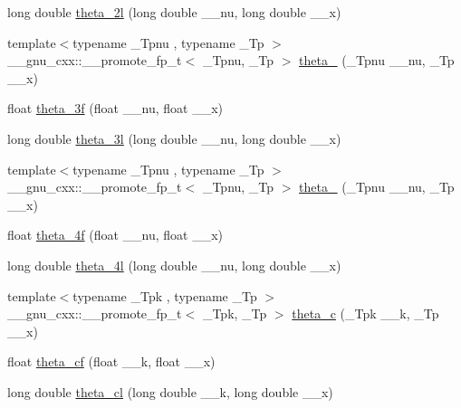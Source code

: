 \begin{DoxyCompactItemize}
\item 
long double \hyperlink{group__gnu__math__spec__func_gac5a30c772d4888442665945e7f3fa017}{theta\+\_\+2l} (long double \+\_\+\+\_\+nu, long double \+\_\+\+\_\+x)
\item 
{\footnotesize template$<$typename \+\_\+\+Tpnu , typename \+\_\+\+Tp $>$ }\\\+\_\+\+\_\+gnu\+\_\+cxx\+::\+\_\+\+\_\+promote\+\_\+fp\+\_\+t$<$ \+\_\+\+Tpnu, \+\_\+\+Tp $>$ \hyperlink{group__gnu__math__spec__func_ga34e5d79e6ba8b8b104e690fc1ebc7fd6}{theta\+\_} (\+\_\+\+Tpnu \+\_\+\+\_\+nu, \+\_\+\+Tp \+\_\+\+\_\+x)
\item 
float \hyperlink{group__gnu__math__spec__func_ga9a7c967d2a456f1a6aceee9a53f024b1}{theta\+\_\+3f} (float \+\_\+\+\_\+nu, float \+\_\+\+\_\+x)
\item 
long double \hyperlink{group__gnu__math__spec__func_gaf88874ff6c69940d2191f7947d2ea119}{theta\+\_\+3l} (long double \+\_\+\+\_\+nu, long double \+\_\+\+\_\+x)
\item 
{\footnotesize template$<$typename \+\_\+\+Tpnu , typename \+\_\+\+Tp $>$ }\\\+\_\+\+\_\+gnu\+\_\+cxx\+::\+\_\+\+\_\+promote\+\_\+fp\+\_\+t$<$ \+\_\+\+Tpnu, \+\_\+\+Tp $>$ \hyperlink{group__gnu__math__spec__func_ga25e72f2b50b53d168f8fa653b1a0d012}{theta\+\_} (\+\_\+\+Tpnu \+\_\+\+\_\+nu, \+\_\+\+Tp \+\_\+\+\_\+x)
\item 
float \hyperlink{group__gnu__math__spec__func_ga0c5cbf87e304844ed4c3423be5ca09a5}{theta\+\_\+4f} (float \+\_\+\+\_\+nu, float \+\_\+\+\_\+x)
\item 
long double \hyperlink{group__gnu__math__spec__func_gaaf63a80e90cdcdd66ebb18cd3a84afae}{theta\+\_\+4l} (long double \+\_\+\+\_\+nu, long double \+\_\+\+\_\+x)
\item 
{\footnotesize template$<$typename \+\_\+\+Tpk , typename \+\_\+\+Tp $>$ }\\\+\_\+\+\_\+gnu\+\_\+cxx\+::\+\_\+\+\_\+promote\+\_\+fp\+\_\+t$<$ \+\_\+\+Tpk, \+\_\+\+Tp $>$ \hyperlink{group__gnu__math__spec__func_gaa42db2270eba189b0b82c5a98c52ab9e}{theta\+\_\+c} (\+\_\+\+Tpk \+\_\+\+\_\+k, \+\_\+\+Tp \+\_\+\+\_\+x)
\item 
float \hyperlink{group__gnu__math__spec__func_ga409f898afeaad5e25726ad552cfe6946}{theta\+\_\+cf} (float \+\_\+\+\_\+k, float \+\_\+\+\_\+x)
\item 
long double \hyperlink{group__gnu__math__spec__func_ga0531098c628999cf396217ff997cfdda}{theta\+\_\+cl} (long double \+\_\+\+\_\+k, long double \+\_\+\+\_\+x)
\item 

\end{DoxyCompactItemize}
